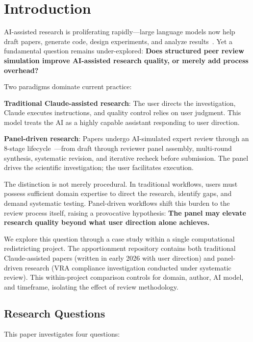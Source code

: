 \section{Introduction}

AI-assisted research is proliferating rapidly---large language models now help draft papers, generate code, design experiments, and analyze results~\cite{zhou2024large}. Yet a fundamental question remains under-explored: \textbf{Does structured peer review simulation improve AI-assisted research quality, or merely add process overhead?}

Two paradigms dominate current practice:

\textbf{Traditional Claude-assisted research}: The user directs the investigation, Claude executes instructions, and quality control relies on user judgment. This model treats the AI as a highly capable assistant responding to user direction.

\textbf{Panel-driven research}: Papers undergo AI-simulated expert review through an 8-stage lifecycle~\cite{dellalibera2026review}---from draft through reviewer panel assembly, multi-round synthesis, systematic revision, and iterative recheck before submission. The panel drives the scientific investigation; the user facilitates execution.

The distinction is not merely procedural. In traditional workflows, users must possess sufficient domain expertise to direct the research, identify gaps, and demand systematic testing. Panel-driven workflows shift this burden to the review process itself, raising a provocative hypothesis: \textbf{The panel may elevate research quality beyond what user direction alone achieves.}

We explore this question through a case study within a single computational redistricting project. The apportionment repository contains both traditional Claude-assisted papers (written in early 2026 with user direction) and panel-driven research (VRA compliance investigation conducted under systematic review). This within-project comparison controls for domain, author, AI model, and timeframe, isolating the effect of review methodology.

\subsection{Research Questions}

This paper investigates four questions:

